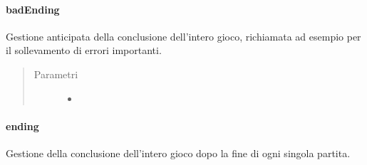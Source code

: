 \documentclass[letterpaper,10pt,italian,openany,oneside]{sphinxmanual}
\begin{document}
\paragraph{badEnding}
\label{\detokenize{source/it/unicam/cs/pa/mastermind/ui/StartView:badending}}

\begin{fulllineitems}
\label{\detokenize{source/it/unicam/cs/pa/mastermind/ui/StartView:it.unicam.cs.pa.mastermind.ui.StartView.badEnding(String)}}
Gestione anticipata della conclusione dell’intero gioco, richiamata ad esempio per il sollevamento di errori importanti.
\begin{quote}\begin{description}
\item[{Parametri}] \leavevmode\begin{itemize}
\item {} 
 \textendash{} 

\end{itemize}

\end{description}\end{quote}

\end{fulllineitems}



\paragraph{ending}
\label{\detokenize{source/it/unicam/cs/pa/mastermind/ui/StartView:ending}}

\begin{fulllineitems}
\label{\detokenize{source/it/unicam/cs/pa/mastermind/ui/StartView:it.unicam.cs.pa.mastermind.ui.StartView.ending()}}
Gestione della conclusione dell’intero gioco dopo la fine di ogni singola partita.

\end{fulllineitems}
\end{document}
